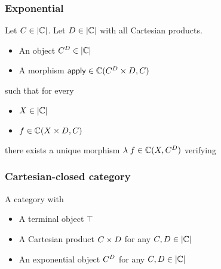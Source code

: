 \documentclass[usenames,dvipsnames,rgb]{beamer}
\begin{document}
\begin{frame}[fragile]
  \frametitle{Exponential}

  Let $C \in \CatObj{\aCategory}$.
  Let $D \in \CatObj{\aCategory}$ with all Cartesian products.

  \vfill

  \begin{itemize}
  \item An object $\ExpObj{C}{D} \in \CatObj{\aCategory}$
  \item A morphism
    $\ExpApply \in \CatMorph[\aCategory]{\ProdObj{\ExpObj{C}{D}}{D}}{C}$
  \end{itemize}
  such that for every
  \begin{itemize}
  \item $X \in \CatObj{\aCategory}$
  \item $f \in \CatMorph[\aCategory]{\ProdObj{X}{D}}{C}$
  \end{itemize}
  there exists a unique morphism $\ExpMorph{f} \in \CatMorph[\aCategory]{X}{\ExpObj{C}{D}}$ verifying
  \begin{center}
  \end{center}

  \vfill

\end{frame}


\begin{frame}[fragile]
  \frametitle{Cartesian-closed category}

  A category \aCategory{} with
  \begin{itemize}
  \item A terminal object $\top$
  \item A Cartesian product $C \times D$ for any $C, D \in \CatObj{\aCategory}$
  \item An exponential object ${C}^{D}$ for any $C, D \in \CatObj{\aCategory}$
  \end{itemize}

\end{frame}
\end{document}
